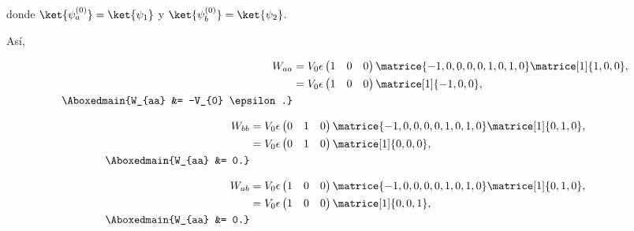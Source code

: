 \documentclass[./../main.tex]{subfiles}
\begin{document}
\begin{exercise}
\begin{enumerate}[label=(\alph*)]
\begin{solution}
            donde \(\ket{\psi_{a}^{(0)}} = \ket{\psi_{1}}\) y \(\ket{\psi_{b}^{(0)}} = \ket{\psi_{2}}\).

            \pagebreak
            Así,

            \begin{align}
                W_{aa} &= V_{0} \epsilon \begin{pmatrix}
                    1 & 0 & 0
                \end{pmatrix} \matrice{-1, 0, 0, 0, 0, 1, 0, 1, 0}\matrice[1]{1, 0, 0},\nonumber\\
                &= V_{0} \epsilon \begin{pmatrix}
                    1 & 0 & 0
                \end{pmatrix}\matrice[1]{-1, 0, 0},\nonumber\\
                \Aboxedmain{W_{aa} &= -V_{0} \epsilon.}\label{eq:element-Waa}
            \end{align}

            \begin{align}
                W_{bb} &= V_{0} \epsilon \begin{pmatrix}
                    0 & 1 & 0
                \end{pmatrix} \matrice{-1, 0, 0, 0, 0, 1, 0, 1, 0}\matrice[1]{0, 1, 0},\nonumber\\
                &= V_{0} \epsilon \begin{pmatrix}
                    0 & 1 & 0
                \end{pmatrix}\matrice[1]{0, 0, 0},\nonumber\\
                \Aboxedmain{W_{aa} &= 0.}\label{eq:element-Wbb}
            \end{align}

            \begin{align}
                W_{ab} &= V_{0} \epsilon \begin{pmatrix}
                    1 & 0 & 0
                \end{pmatrix} \matrice{-1, 0, 0, 0, 0, 1, 0, 1, 0}\matrice[1]{0, 1, 0},\nonumber\\
                &= V_{0} \epsilon \begin{pmatrix}
                    1 & 0 & 0
                \end{pmatrix}\matrice[1]{0, 0, 1},\nonumber\\
                \Aboxedmain{W_{aa} &= 0.}\label{eq:element-Wab}
            \end{align}


\end{solution}
\end{enumerate}
\end{exercise}
\end{document}
